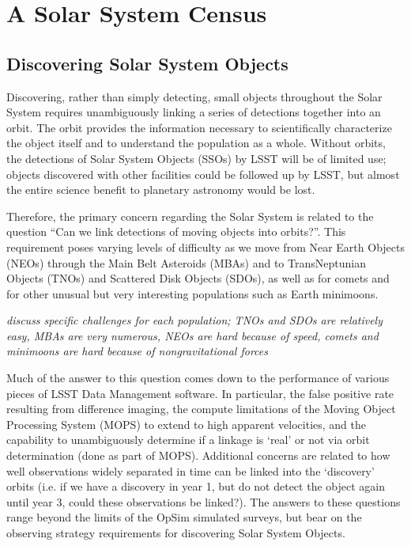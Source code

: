 \chapter[Solar System]{A Solar System Census}
\def\chpname{solarsystem}\label{chp:\chpname}


\section{Discovering Solar System Objects}
\def\secname{discovery}\label{sec:\secname}

Discovering, rather than simply detecting, small objects throughout
the Solar System requires unambiguously linking a series of detections
together into an orbit. The orbit provides the information necessary
to scientifically characterize the object itself and to understand the
population as a whole. Without orbits, the detections of Solar System
Objects (SSOs) by LSST will be of limited use; objects discovered with
other facilities could be followed up by LSST, but almost the entire
science benefit to planetary astronomy would be lost.

Therefore, the primary concern regarding the Solar System is related
to the question ``Can we link detections of moving objects into
orbits?''.  This requirement poses varying levels of difficulty as we
move from Near Earth Objects (NEOs) through the Main Belt Asteroids
(MBAs) and to TransNeptunian Objects (TNOs) and Scattered Disk Objects
(SDOs), as well as for comets and for other unusual but very
interesting populations such as Earth minimoons.

{\it discuss specific challenges for each population; TNOs and SDOs are
  relatively easy, MBAs are very numerous, NEOs are hard because of
  speed, comets and minimoons are hard because of nongravitational forces}

Much of the answer to this question comes down to the performance of
various pieces of LSST Data Management software. In particular, the
false positive rate resulting from difference imaging, the compute
limitations of the Moving Object Processing System (MOPS) to extend to high
apparent velocities, and the capability to unambiguously determine if
a linkage is `real' or not via orbit determination (done as part of
MOPS). Additional concerns are related to how well observations
widely separated in time can be linked into the `discovery' orbits
(i.e. if we have a discovery in year 1, but do not detect the object
again until year 3, could these observations be linked?). The answers
to these questions range beyond the limits of the OpSim simulated
surveys, but bear on the observing strategy requirements for
discovering Solar System Objects.

